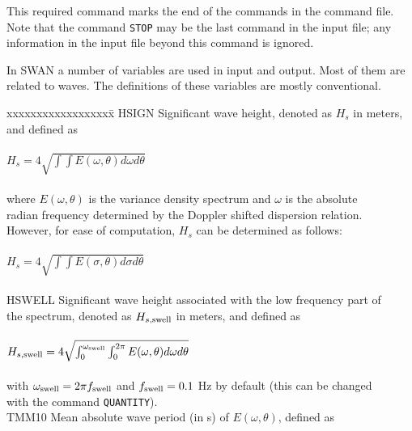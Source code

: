 \documentclass[12pt]{book}
\begin{document}
\noindent
This required command marks the end of the commands in the command file.
Note that the command {\tt STOP} may be the last command in the input file; any information in the input file
beyond this command is ignored.

\appendix

 \label{app:defvar}

In SWAN a number of variables are used in input and output. Most of them are related to waves. The definitions of these variables
are mostly conventional.
\begin{tabbing}
xxxxxxxxxxxxxxxxxx\= \kill
HSIGN                \> Significant wave height, denoted as $H_s$ in meters, and defined as\+\\
                        \\
                        $H_s = 4 \sqrt{\int \int E(\omega, \theta) d\omega d\theta}$ \\
                        \\
                        where $E(\omega,\theta)$ is the variance density spectrum and $\omega$ is the absolute\\
                        radian frequency determined by the Doppler shifted dispersion relation.\\
                        However, for ease of computation, $H_s$ can be determined as follows:\\
                        \\
                        $H_s = 4 \sqrt{\int \int E(\sigma, \theta) d\sigma d\theta}$ \\
                        \-\\
HSWELL               \> Significant wave height associated with the low frequency part of\+\\
                        the spectrum, denoted as $H_{s,{\rm swell}}$ in meters, and defined as\\
                        \\
                        $H_{s,{\rm swell}} = 4 \sqrt{\int_{0}^{\omega_{\rm swell}} \int_{0}^{2\pi} E(\omega, \theta) d\omega d\theta}$ \\
                        \\
                        with $\omega_{\rm swell}=2\pi f_{\rm swell}$ and $f_{\rm swell}=0.1$ Hz by default (this can be changed\\
                        with the command {\tt QUANTITY}). \-\\
TMM10                \> Mean absolute wave period (in s) of $E(\omega,\theta)$, defined as\+\\

\end{tabbing}
\end{document}
